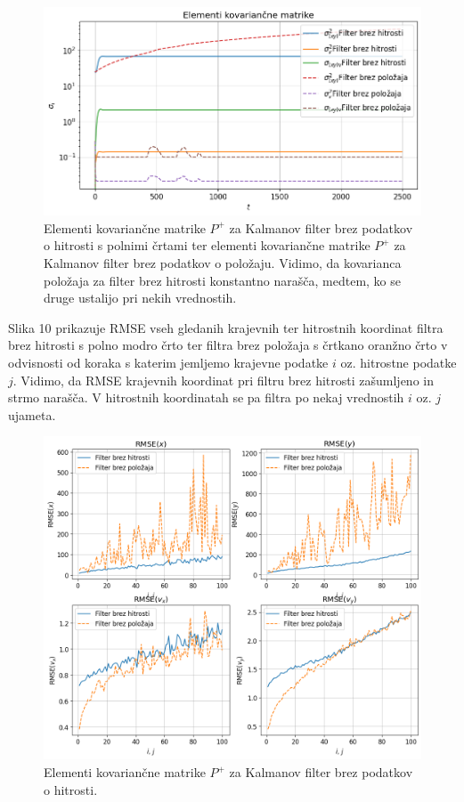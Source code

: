\documentclass[slovene,11pt,a4paper]{article}
\begin{document}
\begin{figure}[h!]
\centering
\includegraphics[width=12cm]{slika9.png}
\caption{Elementi kovariančne matrike $P^+$ za Kalmanov filter brez podatkov o hitrosti s polnimi črtami ter elementi kovariančne matrike $P^+$ za Kalmanov filter brez podatkov o položaju. Vidimo, da kovarianca položaja za filter brez hitrosti konstantno narašča, medtem, ko se druge ustalijo pri nekih vrednostih.}
\end{figure}

Slika 10 prikazuje RMSE vseh gledanih krajevnih ter hitrostnih koordinat filtra brez hitrosti s polno modro črto ter filtra brez položaja s črtkano oranžno črto v odvisnosti od koraka s katerim jemljemo krajevne podatke $i$ oz. hitrostne podatke $j$. Vidimo, da RMSE krajevnih koordinat pri filtru brez hitrosti zašumljeno in strmo narašča. V hitrostnih koordinatah se pa filtra po nekaj vrednostih $i$ oz. $j$ ujameta.

\newpage

\begin{figure}[h!]
\centering
\includegraphics[width=12cm]{slika10.png}
\caption{Elementi kovariančne matrike $P^+$ za Kalmanov filter brez podatkov o hitrosti.}
\end{figure}
\end{document}
